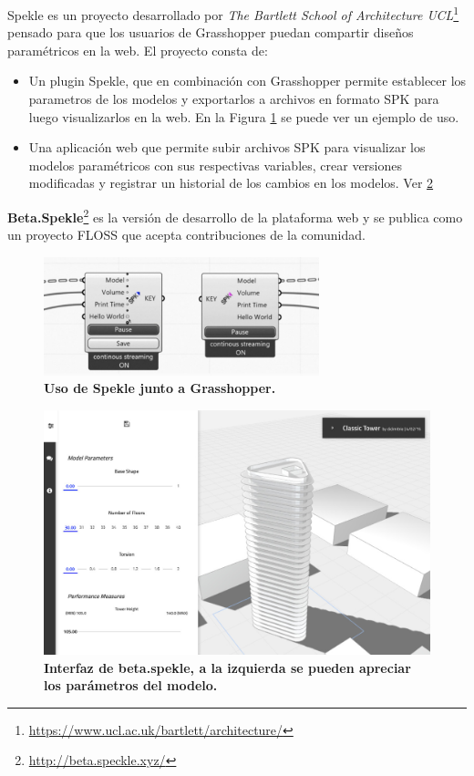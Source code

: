 Spekle \citep{UCL2018} es un proyecto desarrollado por \textit{The Bartlett School of Architecture UCL}\footnote{\url{https://www.ucl.ac.uk/bartlett/architecture/}} pensado para que los usuarios de Grasshopper puedan compartir diseños paramétricos en la web. 
El proyecto consta de:
\begin{itemize}
    \item Un plugin Spekle, que en combinación con Grasshopper permite establecer los parametros de los modelos y exportarlos a archivos en formato SPK para luego visualizarlos en la web. En la Figura \ref{fig:plugin} se puede ver un ejemplo de uso.
    \item Una aplicación web que permite subir archivos SPK para visualizar los modelos paramétricos con sus respectivas variables, crear versiones modificadas y registrar un historial de los cambios en los modelos. Ver \ref{fig:spekle}
\end{itemize}

\textbf{Beta.Spekle}\footnote{\url{http://beta.speckle.xyz/}} es la versión de desarrollo de la plataforma web y se publica como un proyecto FLOSS que acepta contribuciones de la comunidad.

\begin{figure}[h]
\includegraphics[width=8cm]{Img/WEB/web-plugin.jpg}
\centering
\caption{\textbf{ \footnotesize{Uso de Spekle junto a Grasshopper.}}}
\label{fig:plugin}
\end{figure}

\begin{figure}[h]
\includegraphics[width=14cm]{Img/WEB/web-spekle.jpg}
\centering
\caption{\textbf{ \footnotesize{Interfaz de beta.spekle, a la izquierda se pueden apreciar los parámetros del modelo.}}}
\label{fig:spekle}
\end{figure}


